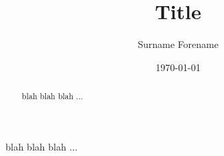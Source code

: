 \documentclass[12pt]{article}
\title{Title}
\author{Surname Forename}
\date{\today}
\begin{document}
\maketitle
\thispagestyle{empty} %

\begin{abstract}
blah blah blah ...
\end{abstract}


blah blah blah ...
\end{document}
